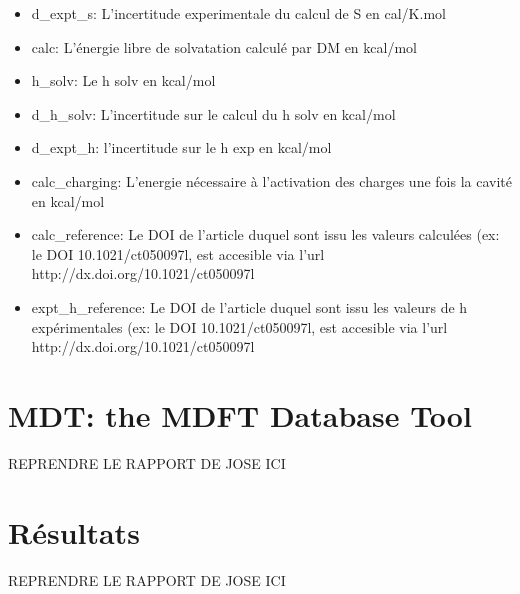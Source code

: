 \begin{itemize}
\item d\_expt\_s: L'incertitude experimentale du calcul de S en cal/K.mol
\item calc: L'énergie libre de solvatation calculé par DM en kcal/mol
\item h\_solv: Le h solv en kcal/mol
\item d\_h\_solv: L'incertitude sur le calcul du h solv en kcal/mol
\item d\_expt\_h: l'incertitude sur le h exp en kcal/mol
\item calc\_charging: L'energie nécessaire à l'activation des charges une fois la cavité en kcal/mol
\item calc\_reference: Le DOI de l'article duquel sont issu les valeurs calculées (ex: le DOI 10.1021/ct050097l, est accesible via l'url http://dx.doi.org/10.1021/ct050097l
\item expt\_h\_reference: Le DOI de l'article duquel sont issu les valeurs de h expérimentales (ex: le DOI 10.1021/ct050097l, est accesible via l'url http://dx.doi.org/10.1021/ct050097l
\end{itemize}



\subsubsection{}
\subsubsection{}
\subsubsection{}
\section{MDT: the MDFT Database Tool}
REPRENDRE LE RAPPORT DE JOSE ICI


\section{Résultats}
REPRENDRE LE RAPPORT DE JOSE ICI
